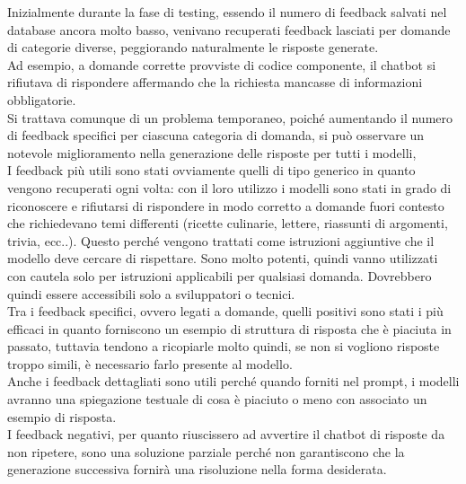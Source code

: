 Inizialmente durante la fase di testing, essendo il numero di feedback salvati nel database ancora molto basso, venivano recuperati feedback lasciati per domande di categorie diverse, peggiorando naturalmente le risposte generate.\\ 
Ad esempio, a domande corrette provviste di codice componente, il chatbot si rifiutava di rispondere affermando che la richiesta mancasse di informazioni obbligatorie.\\
Si trattava comunque di un problema temporaneo, poiché aumentando il numero di feedback specifici per ciascuna categoria di domanda, si può osservare un notevole miglioramento nella generazione delle risposte per tutti i modelli,\\

I feedback più utili sono stati ovviamente quelli di tipo generico in quanto vengono recuperati ogni volta: con il loro utilizzo i modelli sono stati in grado di riconoscere e rifiutarsi di rispondere in
modo corretto a domande fuori contesto che richiedevano temi differenti (ricette culinarie, lettere, riassunti di argomenti, trivia, ecc..). 
Questo perché vengono trattati come istruzioni aggiuntive che il modello deve cercare di rispettare. 
Sono molto potenti, quindi vanno utilizzati con cautela solo per istruzioni applicabili per qualsiasi domanda. Dovrebbero quindi essere accessibili solo a sviluppatori o tecnici. \\
Tra i feedback specifici, ovvero legati a domande, quelli positivi sono stati i più efficaci in quanto forniscono un esempio di struttura di risposta che è piaciuta in passato, 
tuttavia tendono a ricopiarle molto quindi, se non si vogliono risposte troppo simili, è necessario farlo presente al modello. \\
Anche i feedback dettagliati sono utili perché quando forniti nel prompt, i modelli avranno una spiegazione testuale di cosa è piaciuto o meno con associato un esempio di risposta.\\
I feedback negativi, per quanto riuscissero ad avvertire il chatbot di risposte da non ripetere, sono una soluzione parziale perché non garantiscono che la generazione successiva fornirà una risoluzione nella forma desiderata.\\


